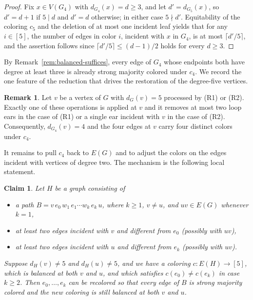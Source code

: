 \documentclass[11pt]{article}
\newtheorem{claim}[theorem]{Claim}
\theoremstyle{definition}
\newtheorem{remark}[theorem]{Remark}
\begin{document}
\begin{proof}
Fix $x\in V(G_4)$ with $d_{G_4}(x)=d\ge 3$, and let $d'=d_{G_5}(x)$, so $d'=d+1$ if $5\mid d$ and $d'=d$ otherwise; in either case $5\nmid d'$. Equitability of the coloring $c_5$ and the deletion of at most one incident leaf yields that for any $i\in[5]$, the number of edges in color $i$, incident with $x$ in $G_4$, is at most $\lceil d'/5\rceil$, and the assertion follows since $\lceil d'/5\rceil\le(d-1)/2$ holds for every $d\ge 3$.
\end{proof}

By Remark~\ref{rem:balanced-suffices}, every edge of $G_4$ whose endpoints both have degree at least three is already strong majority colored under $c_4$. We record the one feature of the reduction that drives the restoration of the degree-five vertices.

\begin{remark}\label{claim:free-color}
Let $v$ be a vertex of $G$ with $d_G(v)=5$ processed by (R1) or (R2). Exactly one of these operations is applied at $v$ and it removes at most two loop ears in the case of (R1) or a single ear incident with $v$ in the case of (R2). Consequently, $d_{G_4}(v)=4$ and the four edges at $v$ carry four distinct colors under $c_4$.
\end{remark}

It remains to pull $c_4$ back to $E(G)$ and to adjust the colors on the edges incident with vertices of degree two. The mechanism is the following local statement. 


\begin{claim}\label{claim:extend}
Let $H$ be a graph consisting of
\begin{itemize}
    \item a path $B=v\,e_0\,w_1\,e_1\cdots w_k\,e_k\,u$, where $k\ge 1$, $v\neq u$, and $uv\in E(G)$ whenever $k=1$,
    \item at least two edges incident with $v$ and different from $e_0$ (possibly with $uv$),
    \item at least two edges incident with $u$ and different from $e_k$ (possibly with $uv$).
\end{itemize} 
Suppose $d_H(v)\neq 5$ and $d_H(u)\neq 5$, and we have a coloring $c: E(H)\to [5]$, which is balanced at both $v$ and $u$, and which satisfies $c(e_0)\neq c(e_k)$ in case $k\geq 2$. Then $e_0,\dots,e_k$ can be recolored so that every edge of $B$ is strong majority colored and the new coloring is still balanced at both $v$ and $u$.
\end{claim}
\end{document}
